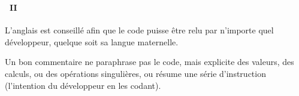 \begin{frame}
  \frametitle{\secname}
  \framesubtitle{\subsecname~II}

  \par
  L'anglais est conseillé afin que le code puisse être relu par n'importe quel développeur, quelque soit sa langue maternelle.
  \vspace{0.5cm}
  \par
  Un bon commentaire ne paraphrase pas le code, mais explicite des valeurs, des calculs, ou des opérations singulières, ou 
  résume une série d'instruction (l'intention du développeur en les codant).
\end{frame}

